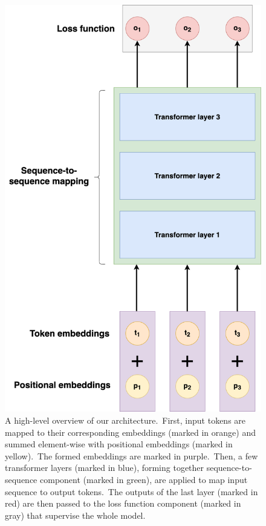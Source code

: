 \documentclass[longabstract, english, mgr]{iithesis}
\theoremstyle{default_theorem_style}\newtheorem{theorem}{Theorem}
\theoremstyle{default_theorem_style}\newtheorem{definition}{Definition}
\begin{document}
\begin{figure}[t]
\centering
\includegraphics[scale=0.23]{high_level_view_of_our_model}
\caption{A high-level overview of our architecture.\ First, input tokens are mapped to their corresponding
embeddings (marked in orange) and summed element-wise with positional embeddings (marked in yellow).\ The formed
embeddings are marked in purple.\ Then, a few transformer layers (marked in blue), forming together sequence-to-sequence
component (marked in green), are applied to map input sequence to output tokens.\ The outputs of the last layer
(marked in red) are then passed to the loss function component (marked in gray) that supervise the whole model.}
\label{fig:high_level_view_of_our_model}
\end{figure}
\end{document}
